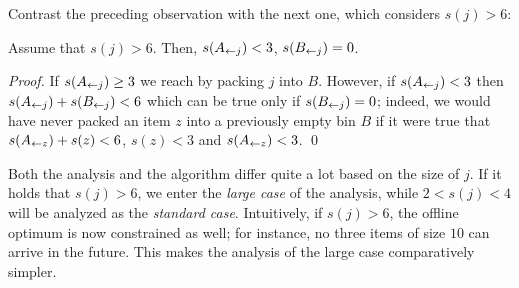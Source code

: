 Contrast the preceding observation with the next one, which considers $s(j) > 6$:

\begin{obs}
\label{obs:1b}
Assume that $s(j) > 6$. Then, $s(A_{\leftarrow j}) < 3$, $s(B_{\leftarrow j}) = 0$.
\end{obs}

\begin{proof} If $s(A_{\leftarrow j}) \ge 3$ we reach  by packing
$j$ into $B$.  However, if $s(A_{\leftarrow j}) < 3$ then $s(A_{\leftarrow j}) + s(B_{\leftarrow j}) < 6$
which can be true only if $s(B_{\leftarrow j}) = 0$; indeed, we would have never packed an item $z$ into
 a previously empty bin $B$ if it were true that $s(A_{\leftarrow z}) + s(z) < 6$, $s(z) < 3$ and $s(A_{\leftarrow z}) < 3$. \qed
\end{proof}

Both the analysis and the algorithm differ quite a lot based on the
size of $j$. If it holds that $s(j) > 6$, we enter the \emph{large
case} of the analysis, while $2 < s(j) < 4$ will be analyzed as the
\emph{standard case}. Intuitively, if $s(j) > 6$, the offline optimum
is now constrained as well; for instance, no three items of size $10$
can arrive in the future. This makes the analysis of
the large case comparatively simpler.
